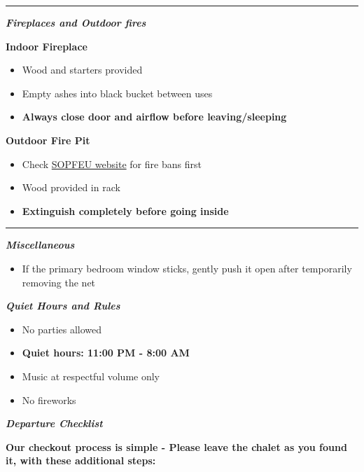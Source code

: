 \documentclass[11pt,a4paper]{article}
\newcommand{\mysection}[1]{
    \vspace{1.5em}
    {\color{skybluescript}\huge\bfseries\itshape #1}
    \vspace{1em}
    \newline
}
\newcommand{\separator}{\vspace{1em}\hrule\vspace{1em}}
\begin{document}
\separator

\mysection{Fireplaces and Outdoor fires}

\textbf{Indoor Fireplace}
\begin{itemize}
    \item Wood and starters provided
    \item Empty ashes into black bucket between uses
    \item \textbf{Always close door and airflow before leaving/sleeping}
\end{itemize}

\textbf{Outdoor Fire Pit}
\begin{itemize}
    \item Check \href{https://sopfeu.qc.ca}{SOPFEU website} for fire bans first
    \item Wood provided in rack
    \item \textbf{Extinguish completely before going inside}
\end{itemize}

\separator

\mysection{Miscellaneous}
\begin{itemize}
    \item If the primary bedroom window sticks, gently push it open after temporarily removing the net
\end{itemize}


\mysection{Quiet Hours and Rules}
\begin{itemize}
    \item No parties allowed
    \item \textbf{Quiet hours: 11:00 PM - 8:00 AM}
    \item Music at respectful volume only
    \item No fireworks
\end{itemize}

\mysection{Departure Checklist}
\textbf{Our checkout process is simple - Please leave the chalet as you found it, with these additional steps:}
\end{document}
